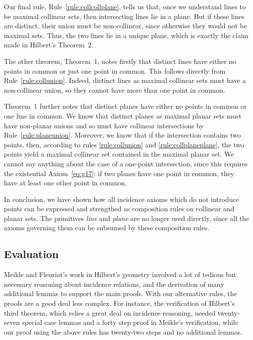Our final rule, Rule~\ref{rule:collcollplane}, tells us that, once we understand lines to be maximal collinear sets, then intersecting lines lie in a plane. But if these lines are distinct, their union must be non-collinear, since otherwise they would not be maximal sets. Thus, the two lines lie in a unique plane, which is exactly the claim made in Hilbert's Theorem~2. 

The other theorem, Theorem~1, notes firstly that distinct lines have either no points in common or just one point in common. This follows directly from Rule~\ref{rule:collunion}. Indeed, distinct lines as maximal collinear sets must have a non-collinear union, so they cannot have more than one point in common. 

Theorem~1 further notes that distinct planes have either no points in common or one line in common. We know that distinct planes as maximal planar sets must have non-planar unions and so must have collinear intersections by Rule~\ref{rule:planeunion}. Moreover, we know that if the intersection contains two points, then, according to rules \ref{rule:collunion} and \ref{rule:collplaneplane}, the two points yield a maximal collinear set contained in the maximal planar set. We cannot say anything about the case of a one-point intersection, since this requires the existential Axiom~\ref{eq:g17}: if two planes have one point in common, they have at least one other point in common.

In conclusion, we have shown how all incidence axioms which do not introduce points can be expressed and strengthed as composition rules on collinear and planar sets. The primitives \emph{line} and \emph{plane} are no longer used directly, since all the axioms governing them can be subsumed by these composition rules. 

\subsection{Evaluation}
Meikle and Fleuriot's work in Hilbert's geometry involved a lot of tedious but necessary reasoning about incidence relations, and the derivation of many additional lemmas to support the main proofs. With our alternative rules, the proofs are a good deal less complex. For instance, the verification of Hilbert's third theorem, which relies a great deal on incidence reasoning, needed twenty-seven special case lemmas and a forty step proof in Meikle's verification, while our proof using the above rules has twenty-two steps and no additional lemmas. 

